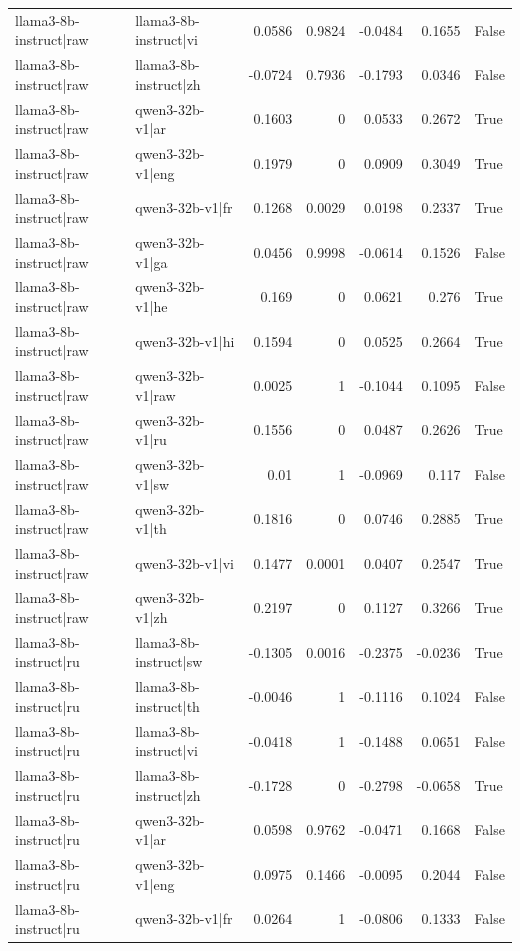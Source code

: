 \begin{table}
\begin{tabular}{l l r r r r l}
llama3-8b-instruct|raw & llama3-8b-instruct|vi & 0.0586 & 0.9824 & -0.0484 & 0.1655 & False \\
llama3-8b-instruct|raw & llama3-8b-instruct|zh & -0.0724 & 0.7936 & -0.1793 & 0.0346 & False \\
llama3-8b-instruct|raw & qwen3-32b-v1|ar & 0.1603 & 0 & 0.0533 & 0.2672 & True \\
llama3-8b-instruct|raw & qwen3-32b-v1|eng & 0.1979 & 0 & 0.0909 & 0.3049 & True \\
llama3-8b-instruct|raw & qwen3-32b-v1|fr & 0.1268 & 0.0029 & 0.0198 & 0.2337 & True \\
llama3-8b-instruct|raw & qwen3-32b-v1|ga & 0.0456 & 0.9998 & -0.0614 & 0.1526 & False \\
llama3-8b-instruct|raw & qwen3-32b-v1|he & 0.169 & 0 & 0.0621 & 0.276 & True \\
llama3-8b-instruct|raw & qwen3-32b-v1|hi & 0.1594 & 0 & 0.0525 & 0.2664 & True \\
llama3-8b-instruct|raw & qwen3-32b-v1|raw & 0.0025 & 1 & -0.1044 & 0.1095 & False \\
llama3-8b-instruct|raw & qwen3-32b-v1|ru & 0.1556 & 0 & 0.0487 & 0.2626 & True \\
llama3-8b-instruct|raw & qwen3-32b-v1|sw & 0.01 & 1 & -0.0969 & 0.117 & False \\
llama3-8b-instruct|raw & qwen3-32b-v1|th & 0.1816 & 0 & 0.0746 & 0.2885 & True \\
llama3-8b-instruct|raw & qwen3-32b-v1|vi & 0.1477 & 0.0001 & 0.0407 & 0.2547 & True \\
llama3-8b-instruct|raw & qwen3-32b-v1|zh & 0.2197 & 0 & 0.1127 & 0.3266 & True \\
llama3-8b-instruct|ru & llama3-8b-instruct|sw & -0.1305 & 0.0016 & -0.2375 & -0.0236 & True \\
llama3-8b-instruct|ru & llama3-8b-instruct|th & -0.0046 & 1 & -0.1116 & 0.1024 & False \\
llama3-8b-instruct|ru & llama3-8b-instruct|vi & -0.0418 & 1 & -0.1488 & 0.0651 & False \\
llama3-8b-instruct|ru & llama3-8b-instruct|zh & -0.1728 & 0 & -0.2798 & -0.0658 & True \\
llama3-8b-instruct|ru & qwen3-32b-v1|ar & 0.0598 & 0.9762 & -0.0471 & 0.1668 & False \\
llama3-8b-instruct|ru & qwen3-32b-v1|eng & 0.0975 & 0.1466 & -0.0095 & 0.2044 & False \\
llama3-8b-instruct|ru & qwen3-32b-v1|fr & 0.0264 & 1 & -0.0806 & 0.1333 & False \\

\end{tabular}
\end{table}
